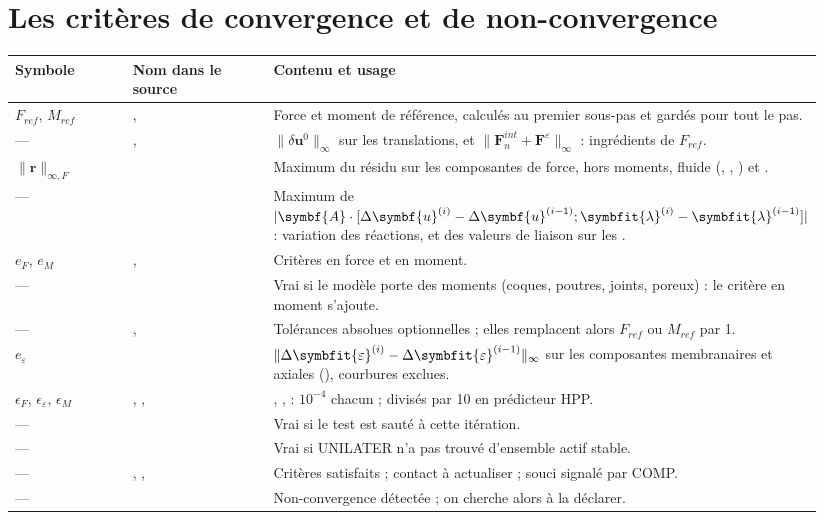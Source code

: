 \documentclass[11pt,a4paper]{article}
\makeatletter
\numberwithin{equation}{section}
\newcommand{\src}[1]{\texttt{\detokenize{#1}}}          %
\newcommand{\pr}[1]{\textsf{#1}}                        %
\newcommand{\op}[1]{\textsf{\small #1}}                 %
\newcommand{\vc}[1]{\symbf{#1}}                         %
\newcommand{\eps}{\varepsilon}
\newcommand{\Deps}{\Delta\symbfit{\varepsilon}}
\newcommand{\vg}[1]{\symbfit{#1}}                       %
\newcommand{\norminf}[1]{\lVert #1\rVert_{\infty}}
\newenvironment{glossaire}[1][Glossaire]{%
  \par\smallskip\needspace{7\baselineskip}\noindent{\sffamily\bfseries\small #1}\par\nopagebreak
  \small
  \renewcommand{\arraystretch}{1.18}
  \begin{longtable}{@{}>{\raggedright\arraybackslash}p{0.17\linewidth}
                     >{\raggedright\arraybackslash}p{0.22\linewidth}
                     >{\raggedright\arraybackslash}p{0.555\linewidth}@{}}
  \toprule
  \textbf{Symbole} & \textbf{Nom dans le source} & \textbf{Contenu et usage}\\
  \midrule\endhead
  \bottomrule\endfoot}
  {\end{longtable}\addtocounter{table}{-1}\normalsize\vspace{-0.4em}}
\makeatother
\begin{document}
\section{Les critères de convergence et de non-convergence}
\label{sec:criteres}

\begin{glossaire}
$F_{ref}$, $M_{ref}$ & \src{XDENO}, \src{XDENOM} & Force et moment de référence, calculés au premier sous-pas et gardés pour tout le pas.\\
— & \src{MZDEP1M}, \src{MZFM} & $\norminf{\delta\vc u^{0}}$ sur les translations, et $\norminf{\vc F^{int}_n + \vc F^{\eps}}$ : ingrédients de $F_{ref}$.\\
$\lVert \vc r\rVert_{\infty,F}$ & \src{XNUMF} & Maximum du résidu sur les composantes de force, hors moments, fluide (\src{FP}, \src{FPQ}, \src{FTP}) et \src{FLX}.\\
— & \src{XNUMG} & Maximum de $|\vc A\cdot[\Delta\vc u^{(i)} - \Delta\vc u^{(i-1)} ; \vg\lambda^{(i)} - \vg\lambda^{(i-1)}]|$ : variation des réactions, et des valeurs de liaison sur les \src{FLX}.\\
$e_F$, $e_M$ & \src{XCONV}, \src{XCONVM} & Critères en force et en moment.\\
— & \src{TSTMOM} & Vrai si le modèle porte des moments (coques, poutres, joints, poreux) : le critère en moment s'ajoute.\\
— & \src{FTOL}, \src{MTOL} & Tolérances absolues optionnelles ; elles remplacent alors $F_{ref}$ ou $M_{ref}$ par 1.\\
$e_\eps$ & \src{DEPSTDM} & $\norminf{\Deps^{(i)} - \Deps^{(i-1)}}$ sur les composantes membranaires et axiales (\src{MLDEFOR}), courbures exclues.\\
$\epsilon_F$, $\epsilon_\eps$, $\epsilon_M$ & \src{ZPREC}, \src{ZPRECEPS}, \src{ZPRECM} & \src{PRECISION}, \src{PRECDEFO}, \src{PRECFLEX} : $10^{-4}$ chacun ; divisés par 10 en prédicteur HPP.\\
— & \src{PASTEST} & Vrai si le test est sauté à cette itération.\\
— & \src{PASUNIL} & Vrai si \pr{UNILATER} n'a pas trouvé d'ensemble actif stable.\\
— & \src{iCONV}, \src{iRECA}, \src{isoucomp} & Critères satisfaits ; contact à actualiser ; souci signalé par \op{COMP}.\\
— & \src{NONCONV} & Non-convergence détectée ; on cherche alors à la déclarer.\\

\end{glossaire}
\end{document}
